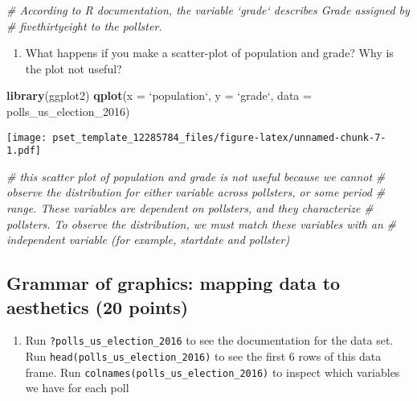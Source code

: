 \documentclass[
]{article}
\newenvironment{Shaded}{\begin{snugshade}}{\end{snugshade}}
\newcommand{\CommentTok}[1]{\textcolor[rgb]{0.56,0.35,0.01}{\textit{#1}}}
\newcommand{\DataTypeTok}[1]{\textcolor[rgb]{0.13,0.29,0.53}{#1}}
\newcommand{\DecValTok}[1]{\textcolor[rgb]{0.00,0.00,0.81}{#1}}
\newcommand{\KeywordTok}[1]{\textcolor[rgb]{0.13,0.29,0.53}{\textbf{#1}}}
\newcommand{\NormalTok}[1]{#1}
\newcommand{\StringTok}[1]{\textcolor[rgb]{0.31,0.60,0.02}{#1}}
\providecommand{\tightlist}{%
  \setlength{\itemsep}{0pt}\setlength{\parskip}{0pt}}
\begin{document}
\begin{Shaded}
\begin{Highlighting}[]
\CommentTok{# According to R documentation, the variable `grade` describes Grade assigned by }
\CommentTok{# fivethirtyeight to the pollster.}
\end{Highlighting}
\end{Shaded}

\begin{enumerate}
\def\labelenumi{\arabic{enumi}.}
\tightlist
\item
  What happens if you make a scatter-plot of population and grade? Why
  is the plot not useful?
\end{enumerate}

\begin{Shaded}
\begin{Highlighting}[]
\KeywordTok{library}\NormalTok{(ggplot2)}
\KeywordTok{qplot}\NormalTok{(}\DataTypeTok{x =} \StringTok{`}\DataTypeTok{population}\StringTok{`}\NormalTok{, }\DataTypeTok{y =} \StringTok{`}\DataTypeTok{grade}\StringTok{`}\NormalTok{, }\DataTypeTok{data =}\NormalTok{ polls_us_election_}\DecValTok{2016}\NormalTok{)}
\end{Highlighting}
\end{Shaded}

\texttt{[image: pset\_template\_12285784\_files/figure-latex/unnamed-chunk-7-1.pdf]}

\begin{Shaded}
\begin{Highlighting}[]
\CommentTok{# this scatter plot of population and grade is not useful because we cannot}
\CommentTok{# observe the distribution for either variable across pollsters, or some period }
\CommentTok{# range. These variables are dependent on pollsters, and they characterize }
\CommentTok{# pollsters. To observe the distribution, we must match these variables with an }
\CommentTok{# independent variable (for example, startdate and pollster)}
\end{Highlighting}
\end{Shaded}

\hypertarget{grammar-of-graphics-mapping-data-to-aesthetics-20-points}{%
\subsection{Grammar of graphics: mapping data to aesthetics (20
points)}\label{grammar-of-graphics-mapping-data-to-aesthetics-20-points}}

\begin{enumerate}
\def\labelenumi{\arabic{enumi}.}
\tightlist
\item
  Run \texttt{?polls\_us\_election\_2016} to see the documentation for
  the data set. Run \texttt{head(polls\_us\_election\_2016)} to see the
  first 6 rows of this data frame. Run
  \texttt{colnames(polls\_us\_election\_2016)} to inspect which
  variables we have for each poll
\end{enumerate}
\end{document}
